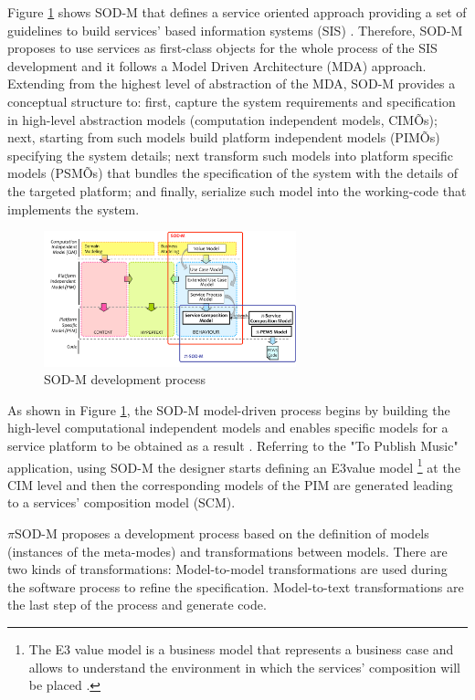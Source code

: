 Figure \ref{fig:sodm} shows  SOD-M that defines a service oriented approach   providing  a set of guidelines to build services' based information systems (SIS) \cite{decastro1,decastro2}.  Therefore, SOD-M proposes to use services as first-class objects for the whole process of the SIS  development and it  follows a Model Driven Architecture (MDA) \cite{miller}  approach. Extending from the highest level of abstraction of the MDA, SOD-M provides  a conceptual structure to: first, capture the system requirements and specification in high-level abstraction models (computation independent models, CIMÕs); next,  starting from such models build platform independent models (PIMÕs) specifying the system details; next transform such models into platform specific models (PSMÕs) that bundles the specification of the system with the details of the targeted platform; and finally, serialize such model into the working-code that implements the system. 
\begin{figure} [htpb]
\centering
\includegraphics[width=0.65\textwidth]{figs/SODM}
\caption{SOD-M development process}
\label{fig:sodm}
\end{figure} 
As shown in Figure \ref{fig:sodm}, the SOD-M model-driven process begins by building the high-level computational independent models and enables specific models for a service platform to be obtained as a result  \cite{decastro1}. Referring to the "To Publish Music" application, using SOD-M the designer starts defining an E3value model \footnote{The E3 value model is a business model that represents a business case %
and allows  to understand the environment in which the services' composition will be placed \cite{e3value}.}  at the CIM level and then the corresponding models of the PIM are generated leading to a services' composition model (SCM).

$\pi$SOD-M proposes a development process based on the definition of models (instances of the meta-modes) and transformations between models.
There are two kinds of transformations: Model-to-model transformations are used during the software process to refine the specification.
Model-to-text transformations are the last step of the process and generate code.

